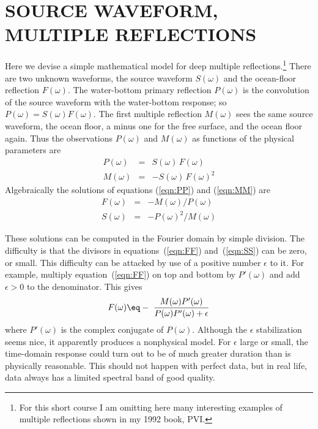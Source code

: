 \section{SOURCE WAVEFORM, MULTIPLE REFLECTIONS}
Here we devise a simple mathematical model
for deep  multiple reflections.\footnote{
                For this short course I am omitting here many interesting
                examples of multiple reflections
                shown in my 1992 book, PVI.
                }
There are two unknown waveforms,
the source waveform $S(\omega )$
and the ocean-floor reflection $F(\omega )$.
The water-bottom primary reflection $P(\omega )$
is the convolution of the source waveform
with the water-bottom response; so $P(\omega )=S(\omega )F(\omega )$.
The first multiple reflection $M(\omega )$ sees the same source waveform,
the ocean floor, a minus one for the free surface, and the ocean floor again.
Thus the observations $P(\omega )$ and $M(\omega )$
as functions of the physical parameters are
\begin{eqnarray}
P(\omega )&=&S(\omega )\,F(\omega )      \label{eqn:PP} \\
M(\omega )&=&-S(\omega )\,F(\omega )^2   \label{eqn:MM}
\end{eqnarray}
Algebraically the solutions of equations
(\ref{eqn:PP}) and
(\ref{eqn:MM}) are
\begin{eqnarray}
F(\omega )&=& - M(\omega )/P(\omega )   \label{eqn:FF} \\
S(\omega )&=& - P(\omega )^2/M(\omega ) \label{eqn:SS}
\end{eqnarray}

\par
These solutions can be computed in the Fourier domain
by simple division.
The difficulty is that the divisors in
equations~(\ref{eqn:FF}) and~(\ref{eqn:SS})
can be zero, or small.
This difficulty can be attacked by use of a positive number $\epsilon$
to  it.
For example, multiply equation~(\ref{eqn:FF}) on top and bottom
by $P'(\omega )$ and add $\epsilon >0$ to the denominator.
This gives
\begin{equation}
F(\omega )\eq
- \ {M(\omega ) P'(\omega ) \over P(\omega )P'(\omega ) + \epsilon}
\label{eqn:epsilon}
\end{equation}
where $ P'(\omega )$ is the complex conjugate of $P(\omega )$.
Although the $\epsilon$ stabilization seems nice,
it apparently produces a nonphysical model.
For $\epsilon$ large or small, the time-domain response
could turn out to be of much greater duration than is physically reasonable. 
This should not happen with perfect data, but in real life,
data always has a limited spectral band of good quality.

